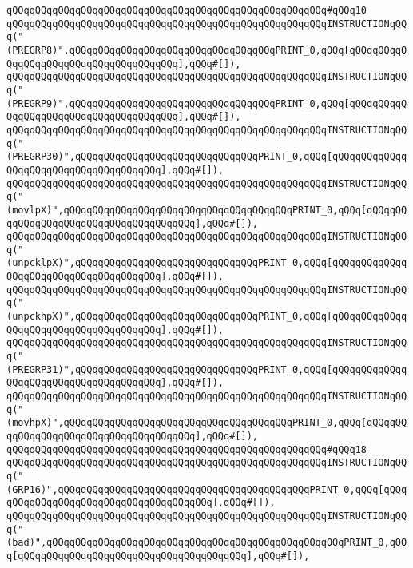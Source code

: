 \verb|qQQqqQQqqQQqqQQqqQQqqQQqqQQqqQQqqQQqqQQqqQQqqQQqqQQqqQQq#qQQq10|\newline
\verb|qQQqqQQqqQQqqQQqqQQqqQQqqQQqqQQqqQQqqQQqqQQqqQQqqQQqqQQqINSTRUCTIONqQQq("(PREGRP8)",qQQqqQQqqQQqqQQqqQQqqQQqqQQqqQQqqQQqPRINT_0,qQQq[qQQqqQQqqQQqqQQqqQQqqQQqqQQqqQQqqQQqqQQq],qQQq#[]),|\newline
\verb|qQQqqQQqqQQqqQQqqQQqqQQqqQQqqQQqqQQqqQQqqQQqqQQqqQQqqQQqINSTRUCTIONqQQq("(PREGRP9)",qQQqqQQqqQQqqQQqqQQqqQQqqQQqqQQqqQQqPRINT_0,qQQq[qQQqqQQqqQQqqQQqqQQqqQQqqQQqqQQqqQQqqQQq],qQQq#[]),|\newline
\verb|qQQqqQQqqQQqqQQqqQQqqQQqqQQqqQQqqQQqqQQqqQQqqQQqqQQqqQQqINSTRUCTIONqQQq("(PREGRP30)",qQQqqQQqqQQqqQQqqQQqqQQqqQQqqQQqPRINT_0,qQQq[qQQqqQQqqQQqqQQqqQQqqQQqqQQqqQQqqQQqqQQq],qQQq#[]),|\newline
\verb|qQQqqQQqqQQqqQQqqQQqqQQqqQQqqQQqqQQqqQQqqQQqqQQqqQQqqQQqINSTRUCTIONqQQq("(movlpX)",qQQqqQQqqQQqqQQqqQQqqQQqqQQqqQQqqQQqqQQqPRINT_0,qQQq[qQQqqQQqqQQqqQQqqQQqqQQqqQQqqQQqqQQqqQQq],qQQq#[]),|\newline
\verb|qQQqqQQqqQQqqQQqqQQqqQQqqQQqqQQqqQQqqQQqqQQqqQQqqQQqqQQqINSTRUCTIONqQQq("(unpcklpX)",qQQqqQQqqQQqqQQqqQQqqQQqqQQqqQQqPRINT_0,qQQq[qQQqqQQqqQQqqQQqqQQqqQQqqQQqqQQqqQQqqQQq],qQQq#[]),|\newline
\verb|qQQqqQQqqQQqqQQqqQQqqQQqqQQqqQQqqQQqqQQqqQQqqQQqqQQqqQQqINSTRUCTIONqQQq("(unpckhpX)",qQQqqQQqqQQqqQQqqQQqqQQqqQQqqQQqPRINT_0,qQQq[qQQqqQQqqQQqqQQqqQQqqQQqqQQqqQQqqQQqqQQq],qQQq#[]),|\newline
\verb|qQQqqQQqqQQqqQQqqQQqqQQqqQQqqQQqqQQqqQQqqQQqqQQqqQQqqQQqINSTRUCTIONqQQq("(PREGRP31)",qQQqqQQqqQQqqQQqqQQqqQQqqQQqqQQqPRINT_0,qQQq[qQQqqQQqqQQqqQQqqQQqqQQqqQQqqQQqqQQqqQQq],qQQq#[]),|\newline
\verb|qQQqqQQqqQQqqQQqqQQqqQQqqQQqqQQqqQQqqQQqqQQqqQQqqQQqqQQqINSTRUCTIONqQQq("(movhpX)",qQQqqQQqqQQqqQQqqQQqqQQqqQQqqQQqqQQqqQQqPRINT_0,qQQq[qQQqqQQqqQQqqQQqqQQqqQQqqQQqqQQqqQQqqQQq],qQQq#[]),|\newline
\verb|qQQqqQQqqQQqqQQqqQQqqQQqqQQqqQQqqQQqqQQqqQQqqQQqqQQqqQQq#qQQq18|\newline
\verb|qQQqqQQqqQQqqQQqqQQqqQQqqQQqqQQqqQQqqQQqqQQqqQQqqQQqqQQqINSTRUCTIONqQQq("(GRP16)",qQQqqQQqqQQqqQQqqQQqqQQqqQQqqQQqqQQqqQQqqQQqPRINT_0,qQQq[qQQqqQQqqQQqqQQqqQQqqQQqqQQqqQQqqQQqqQQq],qQQq#[]),|\newline
\verb|qQQqqQQqqQQqqQQqqQQqqQQqqQQqqQQqqQQqqQQqqQQqqQQqqQQqqQQqINSTRUCTIONqQQq("(bad)",qQQqqQQqqQQqqQQqqQQqqQQqqQQqqQQqqQQqqQQqqQQqqQQqqQQqPRINT_0,qQQq[qQQqqQQqqQQqqQQqqQQqqQQqqQQqqQQqqQQqqQQq],qQQq#[]),|\newline
